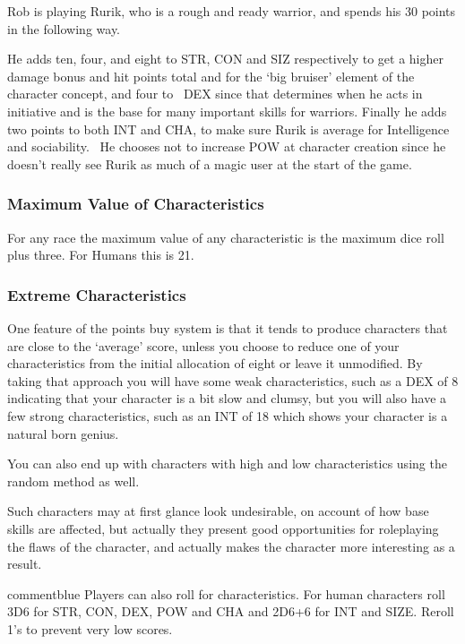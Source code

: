 \begin{rpg-examplebox}
Rob is playing Rurik, who is a rough and ready warrior, and spends his 30 points in the following way.

	\stats[STR=18, CON=12, DEX=12, SIZ=16, INT=10, POW=8, CHA=10]

He adds ten, four, and eight to STR, CON and SIZ respectively to get a higher damage bonus and hit points total and for the ‘big bruiser’ element of the character concept, and four to  DEX since that determines when he acts in initiative and is the base for many important skills for warriors. Finally he adds two points to both INT and CHA, to make sure Rurik is average for Intelligence and sociability.  He chooses not to increase POW at character creation since he doesn’t really see Rurik as much of a magic user at the start of the game.
\end{rpg-examplebox}

\subsubsection{Maximum Value of Characteristics}
For any race the maximum value of any characteristic is the maximum dice roll plus three. For Humans this is 21.

\subsubsection{Extreme Characteristics}
One feature of the points buy system is that it tends to produce characters that are close to the ‘average’ score, unless you choose to reduce one of your characteristics from the initial allocation of eight or leave it unmodified. By taking that approach you will have some weak characteristics, such as a DEX of 8 indicating that your character is a bit slow and clumsy, but you will also have a few strong characteristics, such as an INT of 18 which shows your character is a natural born genius. 

You can also end up with characters with high and low characteristics using the random method as well.

Such characters may at first glance look undesirable, on account of how base skills are affected, but actually they present good opportunities for roleplaying the flaws of the character, and actually makes the character more interesting as a result.

\begin{rpg-box}{commentblue}
Players can also roll for characteristics. For human characters roll 3D6 for STR, CON, DEX, POW and CHA and 2D6+6 for INT and SIZE. Reroll 1's to prevent very low scores.
\end{rpg-box}


